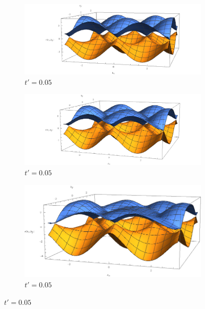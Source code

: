 \documentclass{article}
\begin{document}
\begin{figure}
\centering
\begin{subfigure}[b]{1.2\textwidth}
\centering
\includegraphics[width=\textwidth]{graphene_005.png}
\caption{$t'=0.05$}
\end{subfigure}	 
\begin{subfigure}[b]{1.2\textwidth}
\centering
\includegraphics[width=\textwidth]{graphene_01.png}
\caption{$t'=0.05$}
\end{subfigure}	
\begin{subfigure}[b]{0.9\textwidth}
\centering
\includegraphics[width=\textwidth]{graphene_02.png}
\caption{$t'=0.05$}
\end{subfigure}	  
\end{figure}
\end{document}
